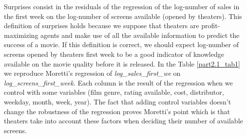 Surprises consist in the residuals of the regression of the log-number of sales in the first week on the log-number of screens available (opened by theaters). This definition of surprises holds because we suppose that theaters are profit-maximizing agents and make use of all the available information to predict the success of a movie. If this definition is correct, we should expect log-number of screens opened by theaters first week to be a good indicator of knowledge available on the movie quality before it is released. In the Table \ref{part2.1_tab1} we reproduce Moretti's regression of \textit{log\_sales\_first\_we} on \textit{log\_screens\_first\_week}. Each column is the result of the regression when we control with some variables (film genre, rating available, cost, distributor, weekday, month, week, year). The fact that adding control variables doesn't change the robustness of the regression proves Moretti's point which is that theaters take into account these factors when deciding their number of available screens. 

